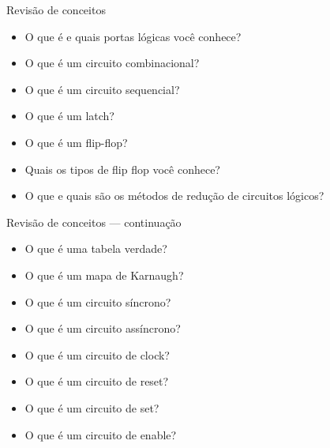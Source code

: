 \begin{frame}{Revisão de conceitos}
    \begin{itemize}
        \item O que é e quais portas lógicas você conhece?
        \item O que é um circuito combinacional?
        \item O que é um circuito sequencial?
        \item O que é um latch?
        \item O que é um flip-flop?
        \item Quais os tipos de flip flop você conhece?
        \item O que e quais são os métodos de redução de circuitos lógicos?
    \end{itemize}
\end{frame}

\begin{frame}{Revisão de conceitos — continuação}
    \begin{itemize}
        \item O que é uma tabela verdade?
        \item O que é um mapa de Karnaugh?
        \item O que é um circuito síncrono?
        \item O que é um circuito assíncrono?
        \item O que é um circuito de clock?
        \item O que é um circuito de reset?
        \item O que é um circuito de set?
        \item O que é um circuito de enable?
    \end{itemize}
\end{frame}
